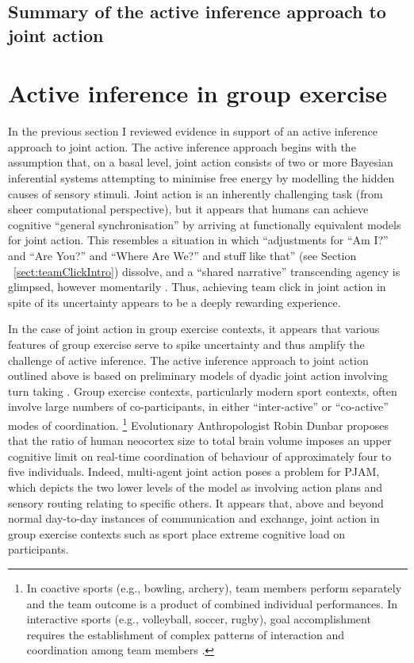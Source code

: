 \begin{CJK}{UTF8}{gbsn}
\subsection{Summary of the active inference approach to joint action}






\section{Active inference in group exercise \label{sect:activeInfGE}}

In the previous section I reviewed evidence in support of an active inference approach to joint action.  The active inference approach begins with the assumption that, on a basal level, joint action consists of two or more Bayesian inferential systems attempting to minimise free energy by modelling the hidden causes of sensory stimuli.  Joint action is an inherently challenging task (from sheer computational perspective), but it appears that humans can achieve cognitive ``general synchronisation'' by arriving at functionally equivalent models for joint action.  This resembles a situation in which ``adjustments for ``Am I?'' and ``Are You?'' and ``Where Are We?'' and stuff like that'' (see Section ~\ref{sect:teamClickIntro}) dissolve, and a ``shared narrative'' transcending agency is glimpsed, however momentarily \citep{Friston2015}.  Thus, achieving team click in joint action in spite of its uncertainty appears to be a deeply rewarding experience.

In the case of joint action in group exercise contexts, it appears that various features of group exercise serve to spike uncertainty and thus amplify the challenge of active inference.  The active inference approach to joint action outlined above is based on preliminary models of dyadic joint action involving turn taking \citep[i.e., in bird song exchanges][]{Friston2015}.  Group exercise contexts, particularly modern sport contexts, often involve large numbers of co-participants, in either ``inter-active'' or ``co-active'' modes of coordination.
    \footnote{
    In coactive sports (e.g., bowling, archery), team members perform separately and the team outcome is a product of combined individual performances. In interactive sports (e.g., volleyball, soccer, rugby), goal accomplishment requires the establishment of complex patterns of interaction and coordination among team members \citep{Filho2014}.
    }
Evolutionary Anthropologist Robin Dunbar \textcite{Dunbar1992} proposes that the ratio of human neocortex size to total brain volume imposes an upper cognitive limit on real-time coordination of behaviour of approximately four to five individuals.  Indeed, multi-agent joint action poses a problem for PJAM, which depicts the two lower levels of the model as involving action plans and sensory routing relating to specific others. It appears that, above and beyond normal day-to-day instances of communication and exchange, joint action in group exercise contexts such as sport place extreme cognitive load on participants.


\end{CJK}
